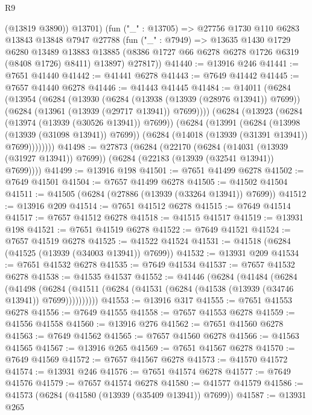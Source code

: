 \begin{lexlean}{R9}
\begin{coremodule}
          (@13819 @3890))
        @13701)
      (fun ("_" : @13705) =>
      @27756
        @1730
        @110
        @6283
        @13843
        @13848
        @7947
        @27788
        (fun ("_" : @7949) =>
        @13635
          @1430
          @1729
          @6280
          @13489
          @13883
          @13885
          (@8386 @1727 @66 @6278 @6278 @1726 @6319 (@8408 @1726) @8411)
          @13897)
        @27817))
@41440 := @13916 @246
@41441 := @7651 @41440
@41442 := @41441 @6278
@41443 := @7649 @41442
@41445 := @7657 @41440 @6278
@41446 := @41443 @41445
@41484 := @14011
    (@6284
      (@13954
        (@6284
          (@13930
            (@6284 (@13938 (@13939 (@28976 @13941)) @7699))
            (@6284 (@13961 (@13939 (@29717 @13941)) @7699))))
        (@6284
          (@13923
            (@6284 (@13974 (@13939 (@30526 @13941)) @7699))
            (@6284
              (@13991
                (@6284 (@13998 (@13939 (@31098 @13941)) @7699))
                (@6284 (@14018 (@13939 (@31391 @13941)) @7699))))))))
@41498 := @27873
    (@6284
      (@22170
        (@6284 (@14031 (@13939 (@31927 @13941)) @7699))
        (@6284 (@22183 (@13939 (@32541 @13941)) @7699))))
@41499 := @13916 @198
@41501 := @7651 @41499 @6278
@41502 := @7649 @41501
@41504 := @7657 @41499 @6278
@41505 := @41502 @41504
@41511 := @41505 (@6284 (@27886 (@13939 (@33264 @13941)) @7699))
@41512 := @13916 @209
@41514 := @7651 @41512 @6278
@41515 := @7649 @41514
@41517 := @7657 @41512 @6278
@41518 := @41515 @41517
@41519 := @13931 @198
@41521 := @7651 @41519 @6278
@41522 := @7649 @41521
@41524 := @7657 @41519 @6278
@41525 := @41522 @41524
@41531 := @41518 (@6284 (@41525 (@13939 (@34003 @13941)) @7699))
@41532 := @13931 @209
@41534 := @7651 @41532 @6278
@41535 := @7649 @41534
@41537 := @7657 @41532 @6278
@41538 := @41535 @41537
@41552 := @41446
    (@6284
      (@41484
        (@6284
          (@41498
            (@6284 (@41511 (@6284 (@41531 (@6284 (@41538 (@13939 (@34746 @13941)) @7699))))))))))
@41553 := @13916 @317
@41555 := @7651 @41553 @6278
@41556 := @7649 @41555
@41558 := @7657 @41553 @6278
@41559 := @41556 @41558
@41560 := @13916 @276
@41562 := @7651 @41560 @6278
@41563 := @7649 @41562
@41565 := @7657 @41560 @6278
@41566 := @41563 @41565
@41567 := @13916 @265
@41569 := @7651 @41567 @6278
@41570 := @7649 @41569
@41572 := @7657 @41567 @6278
@41573 := @41570 @41572
@41574 := @13931 @246
@41576 := @7651 @41574 @6278
@41577 := @7649 @41576
@41579 := @7657 @41574 @6278
@41580 := @41577 @41579
@41586 := @41573 (@6284 (@41580 (@13939 (@35409 @13941)) @7699))
@41587 := @13931 @265

\end{coremodule}
\end{lexlean}
